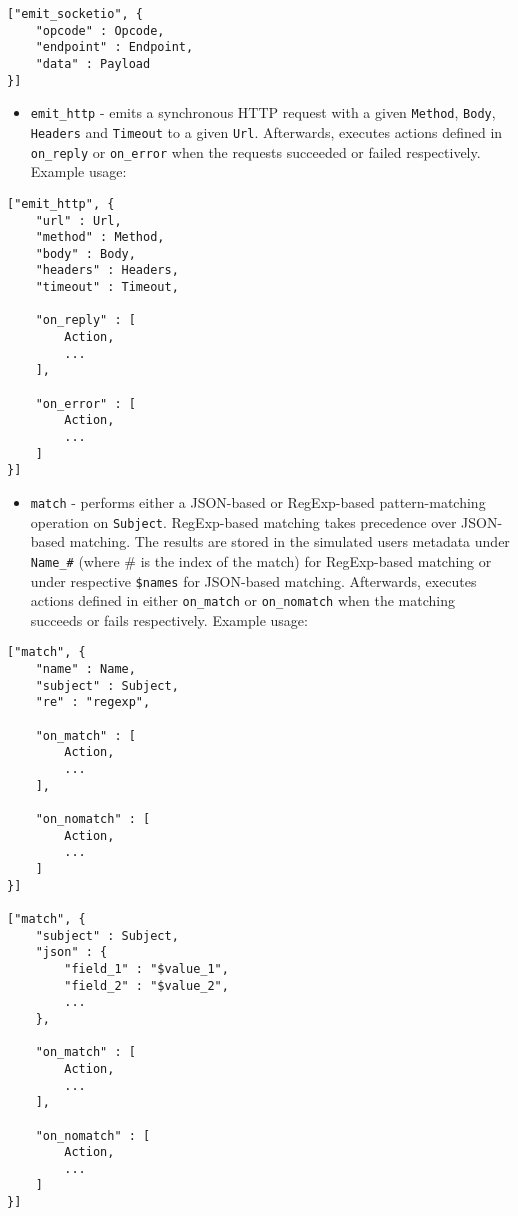 \documentclass[a4paper]{article}
\begin{document}
\begin{verbatim}
["emit_socketio", {
    "opcode" : Opcode,
    "endpoint" : Endpoint,
    "data" : Payload
}]
\end{verbatim}





\begin{itemize}
\item \texttt{emit\_http} - emits a synchronous HTTP request with a given \texttt{Method}, \texttt{Body}, \texttt{Headers} and \texttt{Timeout} to a given \texttt{Url}. Afterwards, executes actions defined in \texttt{on\_reply} or \texttt{on\_error} when the requests succeeded or failed respectively. Example usage:
\end{itemize}

\begin{verbatim}
["emit_http", {
    "url" : Url,
    "method" : Method,
    "body" : Body,
    "headers" : Headers,
    "timeout" : Timeout,

    "on_reply" : [
        Action,
        ...
    ],

    "on_error" : [
        Action,
        ...
    ]
}]
\end{verbatim}





\begin{itemize}
\item \texttt{match} - performs either a JSON-based or RegExp-based pattern-matching operation on \texttt{Subject}. RegExp-based matching takes precedence over JSON-based matching. The results are stored in the simulated users metadata under \texttt{Name\_\#} (where \# is the index of the match) for RegExp-based matching or under respective \texttt{\$names} for JSON-based matching. Afterwards, executes actions defined in either \texttt{on\_match} or \texttt{on\_nomatch} when the matching succeeds or fails respectively. Example usage:
\end{itemize}

\begin{verbatim}
["match", {
    "name" : Name,
    "subject" : Subject,
    "re" : "regexp",

    "on_match" : [
        Action,
        ...
    ],

    "on_nomatch" : [
        Action,
        ...
    ]
}]

["match", {
    "subject" : Subject,
    "json" : {
        "field_1" : "$value_1",
        "field_2" : "$value_2",
        ...
    },

    "on_match" : [
        Action,
        ...
    ],

    "on_nomatch" : [
        Action,
        ...
    ]
}]
\end{verbatim}
\end{document}
